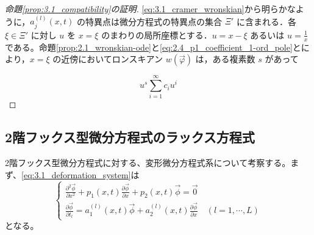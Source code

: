 \begin{proof}[命題\ref{prop:3.1_compatibility}の証明]
\eqref{eq:3.1_cramer_wronskian}から明らかなように，$a_j^{(l)}(x,t)$ の特異点は微分方程式の特異点の集合 $\Xi'$ に含まれる．各 $\xi \in \Xi'$ に対し $u$ を $x=\xi$ のまわりの局所座標とする．$u = x - \xi$ あるいは $u = \frac{1}{x}$ である。命題\ref{prop:2.1_wronskian-ode}と\eqref{eq:2.4_p1_coefficient_1-ord_pole}とにより，$x=\xi$ の近傍においてロンスキアン $w(\vec{\varphi})$ は，ある複素数 $s$ があって

\[
  u^s \sum_{i=1}^{\infty} c_i u^i
\]

\end{proof}


\subsection{2階フックス型微分方程式のラックス方程式}
2階フックス型微分方程式に対する、変形微分方程式系について考察する。まず、\eqref{eq:3.1_deformation_system}は
\begin{equation}
\begin{cases}
\displaystyle \frac{\partial^{2}\vec{\phi}}{\partial x^{2}} + p_{1}(x,t)\frac{\partial\vec{\phi}}{\partial x}+p_{2}(x,t)\vec{\phi} = \vec{0}  \\[1em]
\displaystyle \frac{\partial \vec{\phi}}{\partial t_{l}} = a_{1}^{(l)}(x,t)\vec{\phi}+a_{2}^{(l)}(x,t)\frac{\partial\vec{\phi}}{\partial x} \quad (l=1,\cdots,L)
\end{cases}
\end{equation}
となる。


